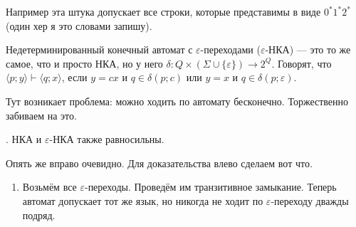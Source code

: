 \documentclass{article}
\begin{document}
\begin{itemize}
\begin{Comment}
\begin{figure}[H]
            \end{figure}\noindent
            Например эта штука допускает все строки, которые представимы в виде $\mathrm0^*\mathrm1^*\mathrm2^*$ (один хер я это словами запишу).
        \end{Comment}
        \dfn Недетерминированный конечный автомат с $\varepsilon$-переходами ($\varepsilon$-НКА) --- это то же самое, что и просто НКА, но у него $\delta\colon Q\times(\Sigma\cup\{\varepsilon\})\to2^Q$.
        \dfn Говорят, что $\langle p;y\rangle\vdash\langle q;x\rangle$, если $y=cx$ и $q\in\delta(p;c)$ или $y=x$ и $q\in\delta(p;\varepsilon)$.
        \begin{Comment}
            Тут возникает проблема: можно ходить по автомату бесконечно. Торжественно забиваем на это.
        \end{Comment}
        \thm {}. НКА и $\varepsilon$-НКА также равносильны.
        \begin{Proof}
            Опять же вправо очевидно. Для доказательства влево сделаем вот что. 
            \begin{enumerate}
                \item Возьмём все $\varepsilon$-переходы. Проведём им транзитивное замыкание. Теперь автомат допускает тот же язык, но никогда не ходит по $\varepsilon$-переходу дважды подряд.
                \begin{figure}[H]
\end{figure}
\end{enumerate}
\end{Proof}
\end{itemize}
\end{document}
